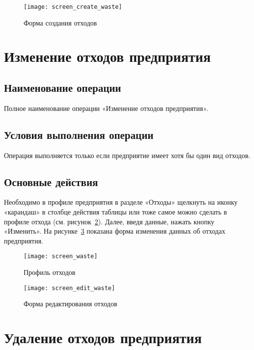 \documentclass[a4paper]{G2-105}
\begin{document}
\begin{figure}[H]
\centering
\texttt{[image: screen\_create\_waste]}
\caption{Форма создания отходов}
\label{fig:screen_create_waste}
\end{figure}

\section{Изменение отходов предприятия}

\ttl

\subsection{Наименование операции}

Полное наименование операции «Изменение отходов предприятия».

\subsection{Условия выполнения операции}

Операция выполняется только если предприятие имеет хотя бы один вид отходов.

\subsection{Основные действия}

Необходимо в профиле предприятия в разделе «Отходы» щелкнуть на иконку «карандаш» в столбце действия таблицы или тоже самое можно сделать в профиле отхода (см. рисунок~\ref{fig:screen_waste}). Далее, введя данные, нажать кнопку «Изменить». На рисунке~\ref{fig:screen_edit_waste} показана форма изменения данных об отходах предприятия.

\begin{figure}[H]
\centering
\texttt{[image: screen\_waste]}
\caption{Профиль отходов}
\label{fig:screen_waste}
\end{figure}

\begin{figure}[H]
\centering
\texttt{[image: screen\_edit\_waste]}
\caption{Форма редактирования отходов}
\label{fig:screen_edit_waste}
\end{figure}

\section{Удаление отходов предприятия}
\end{document}

